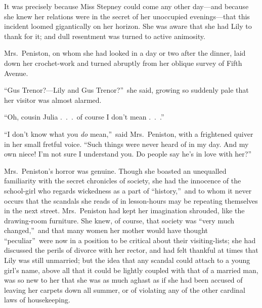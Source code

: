 \documentclass[12pt,a4paper]{book}
\begin{document}
It was precisely because Miss Stepney could come any other
day---and because she knew her relations were in the secret of her
unoccupied evenings---that this incident loomed gigantically on
her horizon. She was aware that she had Lily to thank for it; and
dull resentment was turned to active animosity.





Mrs.\ Peniston, on whom she had looked in a day or two after the
dinner, laid down her crochet-work and turned abruptly from her
oblique survey of Fifth Avenue.





``Gus Trenor?---Lily and Gus Trenor?''\ she said, growing so suddenly
pale that her visitor was almost alarmed.





``Oh, cousin Julia .\ .\ .\ of course I don't mean .\ .\ .''





``I don't know what you \textit{do} mean,''\ said Mrs.\ Peniston, with a
frightened quiver in her small fretful voice. ``Such things were
never heard of in my day. And my own niece! I'm not sure I
understand you. Do people say he's in love with her?''





Mrs.\ Peniston's horror was genuine. Though she boasted an
unequalled familiarity with the secret chronicles of society, she
had the innocence of the school-girl who regards wickedness as a
part of ``history,''\ and to whom it never occurs that the scandals
she reads of in lesson-hours may be repeating themselves in the
next street. Mrs.\ Peniston had kept her imagination shrouded,
like the drawing-room furniture. She knew, of course, that
society was ``very much changed,''\ and that many women her mother
would have thought ``peculiar''\ were now in a position to be
critical about their visiting-lists; she had discussed the perils
of divorce with her rector, and had felt thankful at times that
Lily was still unmarried; but the idea that any scandal could
attach to a young girl's name, above all that it could be lightly
coupled with that of a married man, was so new to her that she
was as much aghast as if she had been accused of leaving her
carpets down all summer, or of violating any of the other
cardinal laws of housekeeping.
\end{document}

